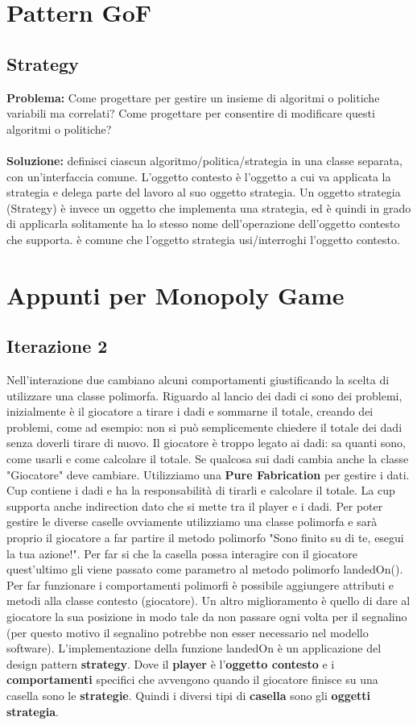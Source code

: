\documentclass{article}
\numberwithin{equation}{subsection}
\begin{document}
\section{Pattern GoF}
\subsection{Strategy}
\textbf{Problema: }Come progettare per gestire un insieme di algoritmi o politiche variabili ma correlati? Come progettare per consentire di modificare questi algoritmi o politiche?\\\\
\textbf{Soluzione: }definisci ciascun algoritmo/politica/strategia in una classe separata, con un'interfaccia comune. L'oggetto contesto è l'oggetto a cui va applicata la strategia e delega parte del lavoro al suo oggetto strategia. Un oggetto strategia (Strategy) è invece un oggetto che implementa una strategia, ed è quindi in grado di applicarla solitamente ha lo stesso nome dell'operazione dell'oggetto contesto che supporta. è comune che l'oggetto strategia usi/interroghi l'oggetto contesto.
\section{Appunti per Monopoly Game}
\subsection{Iterazione 2}
Nell'interazione due cambiano alcuni comportamenti giustificando la scelta di utilizzare una classe polimorfa. Riguardo al lancio dei dadi ci sono dei problemi, inizialmente è il giocatore a tirare i dadi e sommarne il totale, creando dei problemi, come ad esempio: non si può semplicemente chiedere il totale dei dadi senza doverli tirare di nuovo. Il giocatore è troppo legato ai dadi: sa quanti sono, come usarli e come calcolare il totale. Se qualcosa sui dadi cambia anche la classe "Giocatore" deve cambiare. Utilizziamo una \textbf{Pure Fabrication} per gestire i dati. Cup contiene i dadi e ha la responsabilità di tirarli e calcolare il totale. La cup supporta anche indirection dato che si mette tra il player e i dadi. Per poter gestire le diverse caselle ovviamente utilizziamo una classe polimorfa e sarà proprio il giocatore a far partire il metodo polimorfo "Sono finito su di te, esegui la tua azione!". Per far si che la casella possa interagire con il giocatore quest'ultimo gli viene passato come parametro al metodo polimorfo landedOn(). Per far funzionare i comportamenti polimorfi è possibile aggiungere attributi e metodi alla classe contesto (giocatore). Un altro miglioramento è quello di dare al giocatore la sua posizione in modo tale da non passare ogni volta per il segnalino (per questo motivo il segnalino potrebbe non esser necessario nel modello software). L'implementazione della funzione landedOn è un applicazione del design pattern \textbf{strategy}. Dove il \textbf{player} è l'\textbf{oggetto contesto} e i \textbf{comportamenti} specifici che avvengono quando il giocatore finisce su una casella sono le \textbf{strategie}. Quindi i diversi tipi di \textbf{casella} sono gli \textbf{oggetti strategia}.
\end{document}
